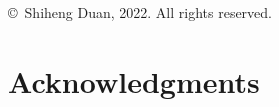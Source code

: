 



\newtheorem{theorem}{Theorem}[section]
\newtheorem{proposition}{Proposition}[section]
\newtheorem{corollary}{Corollary}[section]
\newtheorem{remark}{Remark}[section]

\captionsetup[subfigure]{labelfont=rm}





   \frontmatter
    
   \pagestyle{prelim}
   
   
   \newpage
	
	 \thispagestyle{empty}
	 \begin{titlepage}
	 \vspace*{50em}
	 \begin{center}
		 \copyright \ Shiheng Duan, 2022.  All rights reserved.  
	 \end{center}
	 \end{titlepage}
	 \newpage
	
   
   \tableofcontents
   \doublespacing
   
   \newpage
   
   
   \newpage
   
   \section*{Acknowledgments}
   
   
   \mainmatter
   
   \pagestyle{maintext}
   
   

